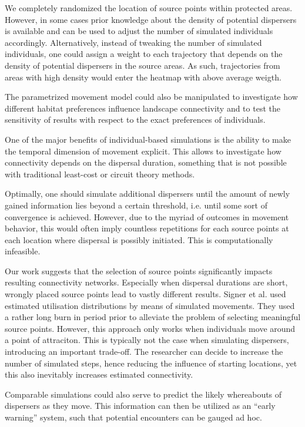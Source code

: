 \documentclass[abstract=on,10pt,a4paper,bibliography=totocnumbered]{article}
\begin{document}
We completely randomized the location of source points within protected areas.
However, in some cases prior knowledge about the density of potential dispersers
is available and can be used to adjust the number of simulated individuals
accordingly. Alternatively, instead of tweaking the number of simulated
individuals, one could assign a weight to each trajectory that depends on the
density of potential dispersers in the source areas. As such, trajectories from
areas with high density would enter the heatmap with above average weigth.

The parametrized movement model could also be manipulated to investigate how
different habitat preferences influence landscape connectivity and to test the
sensitivity of results with respect to the exact preferences of individuals.

One of the major benefits of individual-based simulations is the ability to make
the temporal dimension of movement explicit. This allows to investigate how
connectivity depends on the dispersal duration, something that is not possible
with traditional least-cost or circuit theory methods.

Optimally, one should simulate additional dispersers until the amount of newly
gained information lies beyond a certain threshold, i.e. until some sort of
convergence is achieved. However, due to the myriad of outcomes in movement
behavior, this would often imply countless repetitions for each source points at
each location where dispersal is possibly initiated. This is computationally
infeasible.

Our work suggests that the selection of source points significantly impacts
resulting connectivity networks. Especially when dispersal durations are short,
wrongly placed source points lead to vastly different results. Signer et al.
used estimated utilisation distributions by means of simulated movements. They
used a rather long burn in period prior to alleviate the problem of selecting
meaningful source points. However, this approach only works when individuals
move around a point of attraciton. This is typically not the case when
simulating dispersers, introducing an important trade-off. The researcher can
decide to increase the number of simulated steps, hence reducing the influence
of starting locations, yet this also inevitably increases estimated
connectivity.

Comparable simulations could also serve to predict the likely whereabouts of
dispersers as they move. This information can then be utilized as an  ``early
warning'' system, such that potential encounters can be gauged ad hoc.
\end{document}
